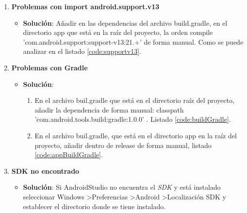 \begin{enumerate}
\begin{itemize}
				
			\end{itemize}
			
		\item {\bf Problemas con import android.support.v13}
			\begin{itemize}
				\item {\bf Solución}: Añadir en las dependencias del archivo {\ttfamily build.gradle}, en el directorio {\ttfamily app} que está en la raíz del proyecto, la orden {\ttfamily compile 'com.android.support:support-v13:21.+'} de forma manual. Como se puede analizar en el listado \ref{code:supportv13}.
				
				\noindent
				
			\end{itemize}
			
		\item {\bf Problemas con Gradle}
			\begin{itemize}
				\item {\bf Solución}:
					\begin{enumerate}
						\item En el archivo {\ttfamily buil.gradle} que está en el directorio raíz del proyecto, añadir la dependencia de forma manual: {\ttfamily classpath 'com.android.tools.build:gradle:1.0.0' }. Listado \ref{code:buildGradle}.
						\item En el archivo {\ttfamily buil.gradle}, que está en el directorio {\ttfamily app} en la raíz del proyecto, añadir dentro de {\ttfamily release} de forma manual, listado \ref{code:appBuildGradle}.
							
					\end{enumerate}
					\noindent
					
					
			\end{itemize}
		
		\item {\bf SDK no encontrado}
			\begin{itemize}
				\item {\bf Solución}: Si AndroidStudio no encuentra el {\it SDK} y está instalado seleccionar {\ttfamily Windows \textgreater Preferencias \textgreater Android \textgreater Localización SDK} y establecer el directorio donde se tiene instalado.
			\end{itemize}
			

\end{enumerate}
